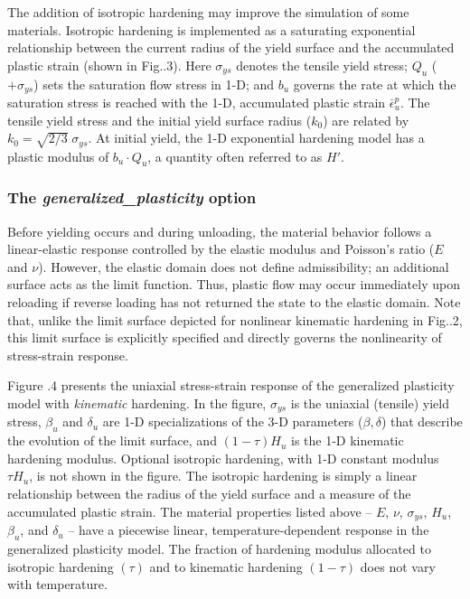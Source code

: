 \documentclass[11pt]{report}
\numberwithin{equation}{section}
\newcommand{\bsf } [1]{\textrm{\textit{#1}}\xspace}
\begin{document}
The addition of isotropic hardening may improve the simulation of some 
materials. Isotropic hardening is implemented as a saturating exponential relationship 
between the current radius of the yield surface and the accumulated plastic strain 
(shown in Fig.\;\thesection.3). Here $\sigma_{ys}$ denotes the tensile yield stress; $Q_u$
($+ \sigma_{ys}$) sets the saturation flow stress in 1-D; and $b_u$ governs the rate at which the
saturation stress is reached with the 1-D, accumulated plastic strain
$\bar \epsilon^p_u$.  The 
tensile yield stress and the initial yield surface radius ($k_0$) are related by 
$k_0 =  \sqrt{2/3}\; \sigma_{ys}$. At initial yield, the 1-D exponential
hardening model has a plastic modulus of $b_u \cdot Q_u$, a quantity
often referred to as $H'$.

\subsubsection {The \bsf{generalized\_plasticity} option}
Before yielding occurs and during 
unloading, the material behavior follows a linear-elastic response controlled 
by the elastic modulus and Poisson's ratio ($E$ and $\nu$).  However, 
the elastic domain does not define 
admissibility; an additional surface acts as the limit function. Thus, plastic flow 
may occur immediately upon reloading if reverse loading has not returned 
the state to the elastic domain.  Note that, unlike the limit 
surface depicted for nonlinear kinematic hardening in Fig.\;\thesection.2, 
this limit surface is explicitly specified and directly governs the 
nonlinearity of stress-strain response.

Figure \thesection.4 presents the uniaxial stress-strain response of the generalized 
plasticity model with \emph{kinematic} hardening.  In the figure,  $\sigma_{ys}$ is the 
uniaxial (tensile) yield stress, $\beta_u$ and $\delta_u$ are 1-D specializations of the
3-D parameters ($\beta, \delta$) that describe the 
evolution of the limit surface, and $(1-\tau)H_u$ is the 1-D kinematic hardening modulus.  
Optional isotropic hardening, with 1-D constant 
modulus $\tau H_u$, is not shown in the figure. The 
isotropic hardening is simply a linear relationship between the 
radius of the yield surface and a measure of the accumulated plastic strain.
The material properties 
listed above -- $E$, $\nu$, $\sigma_{ys}$, $H_u$,  $\beta_u$, and $\delta_u$ --
have a piecewise linear, temperature-dependent response in 
the generalized plasticity model. The fraction of hardening modulus
allocated to isotropic hardening $(\tau)$ and to kinematic
hardening $(1-\tau)$ does not vary with temperature.
\end{document}

